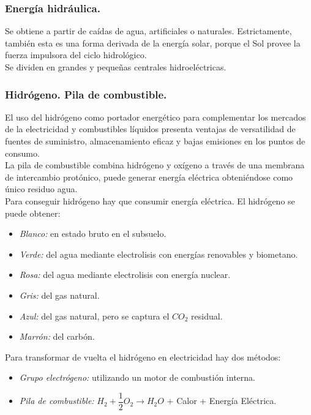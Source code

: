 			\subsubsection{Energía hidráulica.}
				Se obtiene a partir de caídas de agua, artificiales o naturales. Estrictamente, también esta es una forma derivada de la energía solar, porque el Sol provee la fuerza impulsora del ciclo hidrológico.\\
				\indent Se dividen en grandes y pequeñas centrales hidroeléctricas.
		
			\subsubsection{Hidrógeno. Pila de combustible.}
				El uso del hidrógeno como portador energético para complementar los mercados de la electricidad y
				combustibles líquidos presenta ventajas de versatilidad de fuentes de suministro, almacenamiento eficaz y
				bajas emisiones en los puntos de consumo.\\
				\indent La pila de combustible combina hidrógeno y oxígeno a través de una membrana de intercambio protónico,
				puede generar energía eléctrica obteniéndose como único residuo agua.\\
				\indent Para conseguir hidrógeno hay que consumir energía eléctrica. El hidrógeno se puede obtener:
				\begin{itemize}
					\item \textit{Blanco:} en estado bruto en el subsuelo.
					\item \textit{Verde:} del agua mediante electrolisis con energías renovables y biometano.
					\item \textit{Rosa:} del agua mediante electrolisis con energía nuclear.
					\item \textit{Gris:} del gas natural.
					\item \textit{Azul:} del gas natural, pero se captura el $\textit{CO}_2$ residual.
					\item \textit{Marrón:} del carbón.
				\end{itemize}
				Para transformar de vuelta el hidrógeno en electricidad hay dos métodos:
				\begin{itemize}
					\item \textit{Grupo electrógeno:} utilizando un motor de combustión interna.
					\item \textit{Pila de combustible:} $H_2 + \dfrac{1}{2}O_2 \longrightarrow H_2O$ + Calor + Energía Eléctrica.
				\end{itemize}
		
